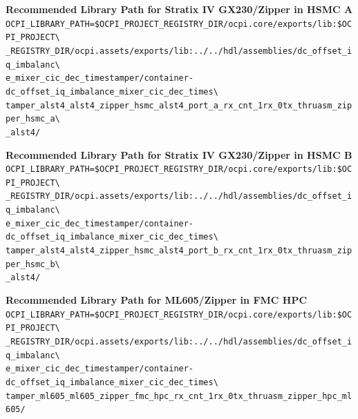 \noindent\textbf{Recommended Library Path for Stratix IV GX230/Zipper in HSMC A}\\

\noindent
\verb|OCPI_LIBRARY_PATH=$OCPI_PROJECT_REGISTRY_DIR/ocpi.core/exports/lib:$OCPI_PROJECT\| \\
\verb|_REGISTRY_DIR/ocpi.assets/exports/lib:../../hdl/assemblies/dc_offset_iq_imbalanc\| \\
\verb|e_mixer_cic_dec_timestamper/container-dc_offset_iq_imbalance_mixer_cic_dec_times\| \\
\verb|tamper_alst4_alst4_zipper_hsmc_alst4_port_a_rx_cnt_1rx_0tx_thruasm_zipper_hsmc_a\| \\
\verb|_alst4/|
\par\medskip

\noindent\textbf{Recommended Library Path for Stratix IV GX230/Zipper in HSMC B}\\

\noindent
\verb|OCPI_LIBRARY_PATH=$OCPI_PROJECT_REGISTRY_DIR/ocpi.core/exports/lib:$OCPI_PROJECT\| \\
\verb|_REGISTRY_DIR/ocpi.assets/exports/lib:../../hdl/assemblies/dc_offset_iq_imbalanc\| \\
\verb|e_mixer_cic_dec_timestamper/container-dc_offset_iq_imbalance_mixer_cic_dec_times\| \\
\verb|tamper_alst4_alst4_zipper_hsmc_alst4_port_b_rx_cnt_1rx_0tx_thruasm_zipper_hsmc_b\| \\
\verb|_alst4/|
\par\medskip

\noindent\textbf{Recommended Library Path for ML605/Zipper in FMC HPC}\\

\noindent
\verb|OCPI_LIBRARY_PATH=$OCPI_PROJECT_REGISTRY_DIR/ocpi.core/exports/lib:$OCPI_PROJECT\| \\
\verb|_REGISTRY_DIR/ocpi.assets/exports/lib:../../hdl/assemblies/dc_offset_iq_imbalanc\| \\
\verb|e_mixer_cic_dec_timestamper/container-dc_offset_iq_imbalance_mixer_cic_dec_times\| \\
\verb|tamper_ml605_ml605_zipper_fmc_hpc_rx_cnt_1rx_0tx_thruasm_zipper_hpc_ml605/|
\par\medskip

